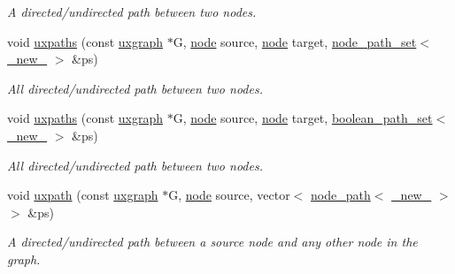 \begin{DoxyCompactItemize}
\begin{DoxyCompactList}\small\item\em A directed/undirected path between two nodes. \end{DoxyCompactList}\item 
void \hyperlink{namespacelgraph_1_1traversal_a16078c9a8e08e18e017590e6e13860ec}{uxpaths} (const \hyperlink{classlgraph_1_1utils_1_1uxgraph}{uxgraph} $\ast$G, \hyperlink{namespacelgraph_1_1utils_a7bd66ede3805ef121bc2835bd48de0cf}{node} source, \hyperlink{namespacelgraph_1_1utils_a7bd66ede3805ef121bc2835bd48de0cf}{node} target, \hyperlink{namespacelgraph_1_1utils_a723c115f9865edfab11a90377b9abef4}{node\+\_\+path\+\_\+set}$<$ \hyperlink{namespacelgraph_1_1utils_a2c84bfde888c42ab3ad6b2cb8a364240}{\+\_\+new\+\_\+} $>$ \&ps)
\begin{DoxyCompactList}\small\item\em All directed/undirected path between two nodes. \end{DoxyCompactList}\item 
void \hyperlink{namespacelgraph_1_1traversal_a7421bd43fdc27c34609cb21b6ca99f84}{uxpaths} (const \hyperlink{classlgraph_1_1utils_1_1uxgraph}{uxgraph} $\ast$G, \hyperlink{namespacelgraph_1_1utils_a7bd66ede3805ef121bc2835bd48de0cf}{node} source, \hyperlink{namespacelgraph_1_1utils_a7bd66ede3805ef121bc2835bd48de0cf}{node} target, \hyperlink{namespacelgraph_1_1utils_aaf50131e15d771a45620336d6e7a77f8}{boolean\+\_\+path\+\_\+set}$<$ \hyperlink{namespacelgraph_1_1utils_a2c84bfde888c42ab3ad6b2cb8a364240}{\+\_\+new\+\_\+} $>$ \&ps)
\begin{DoxyCompactList}\small\item\em All directed/undirected path between two nodes. \end{DoxyCompactList}\item 
void \hyperlink{namespacelgraph_1_1traversal_a1487fb3fc594632e35001a895b31bb8a}{uxpath} (const \hyperlink{classlgraph_1_1utils_1_1uxgraph}{uxgraph} $\ast$G, \hyperlink{namespacelgraph_1_1utils_a7bd66ede3805ef121bc2835bd48de0cf}{node} source, vector$<$ \hyperlink{classlgraph_1_1utils_1_1node__path}{node\+\_\+path}$<$ \hyperlink{namespacelgraph_1_1utils_a2c84bfde888c42ab3ad6b2cb8a364240}{\+\_\+new\+\_\+} $>$ $>$ \&ps)
\begin{DoxyCompactList}\small\item\em A directed/undirected path between a source node and any other node in the graph. \end{DoxyCompactList}\item 

\end{DoxyCompactItemize}
